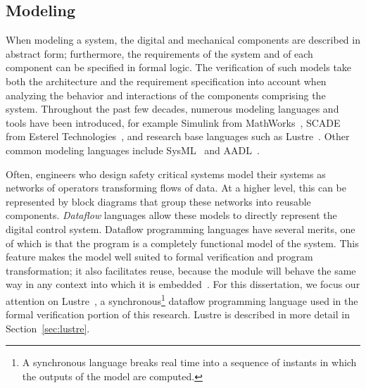 \subsection{Modeling}
\label{sec:modeling}
When modeling a system, the digital and mechanical components are described in abstract form; furthermore, the requirements of the system and of each component can be specified in formal logic. The verification of such models take both the architecture and the requirement specification into account when analyzing the behavior and interactions of the components comprising the system. Throughout the past few decades, numerous modeling languages and tools have been introduced, for example Simulink from MathWorks~\cite{MathWorks}, SCADE from Esterel Technologies~\cite{abdulla2004designing}, and research base languages such as Lustre~\cite{Halbwachs91:IEEE}. Other common modeling languages include SysML~\cite{friedenthal2014practical} and AADL~\cite{FeilerModelBasedEngineering2012}. 

Often, engineers who design safety critical systems model their systems as networks of operators transforming flows of data. At a higher level, this can be represented by block diagrams that group these networks into reusable components. {\em Dataflow} languages allow these models to directly represent the digital control system. Dataflow programming languages have several merits, one of which is that the program is a completely functional model of the system. This feature makes the model well suited to formal verification and program transformation; it also facilitates reuse, because the module will behave the same way in any context into which it is embedded~\cite{joshi2008behavioral}. For this dissertation, we focus our attention on Lustre~\cite{Halbwachs91:IEEE}, a synchronous\footnote{A synchronous language breaks real time into a sequence of instants in which the outputs of the model are computed.} dataflow programming language used in the formal verification portion of this research. Lustre is described in more detail in Section~\ref{sec:lustre}. 




